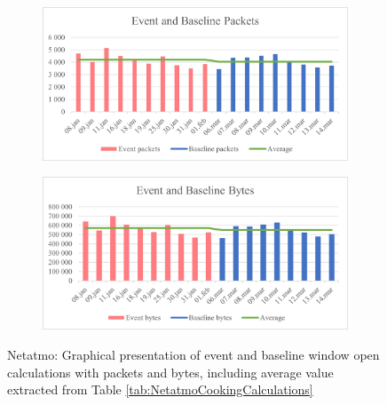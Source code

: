 \begin{figure}[H]
    \centering
    \begin{subfigure}{0.8\textwidth}
       \centering
       \includegraphics[width=1\hsize]{figures/Netatmo_Window_Calculations_Packets.png} 
    \end{subfigure}
    \begin{subfigure}{0.8\textwidth}
        \centering
        \includegraphics[width=1\hsize]{figures/Netatmo_Window_Calculations_Bytes.png} 
    \end{subfigure}
    \caption{Netatmo: Graphical presentation of event and baseline window open calculations with packets and bytes, including average value extracted from Table \ref{tab:NetatmoCookingCalculations}}
    \label{fig:NetatmoWindowCalculations}
\end{figure}

